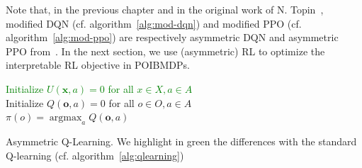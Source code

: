 Note that, in the previous chapter and in the original work of N. Topin~\cite{topin2021iterative}, modified DQN (cf. algorithm~\ref{alg:mod-dqn}) and modified PPO (cf. algorithm~\ref{alg:mod-ppo}) are respectively asymmetric DQN and asymmetric PPO from~\cite{baisero-dqn,baisero-ppo}.
In the next section, we use (asymmetric) RL to optimize the interpretable RL objective in POIBMDPs.
\begin{algorithm}
    \textcolor{green}{Initialize $U(\boldsymbol{x},a) = 0$ for all $x \in X, a \in A$ \\}
    Initialize $Q(\boldsymbol{o},a) = 0$ for all $o \in O, a \in A$ \\

    $\pi(o) = \operatorname{argmax}_a Q(\boldsymbol{o},a)$ 
    \caption{Asymmetric Q-Learning. We highlight in green the differences with the standard Q-learning (cf. algorithm~\ref{alg:qlearning})}\label{alg:asymqlearning}
\end{algorithm}

